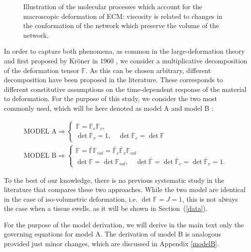 \documentclass[runningheads]{llncs}
\newcommand{\F}{\ensuremath{\mathbb{F}}}
\begin{document}
\begin{figure}[h!]
	\def\svgwidth{1.0\linewidth}
	
	\caption{Illustration of the molecular processes which account for the macroscopic deformation of ECM: viscosity is related to changes in the conformation of the network which preserve the volume of the network.}
	\label{deformation}
\end{figure}

In order to capture both phenomena, as common in the large-deformation theory \cite{Article1,CACCAVO2,Plasto,magneto,NGUYEN,growthtum} and first proposed by Kr\"{o}ner in 1960 \cite{kro}, we consider a multiplicative decomposition of the deformation tensor $\F$. As this can be chosen arbitrary, different decomposition have been proposed in the literature. These corresponds to different constitutive assumptions on the time-dependent response of the material to deformation. For the purpose of this study, we consider the two most commonly used, which will be here denoted as model A \cite{Article1,CACCAVO2,Plasto} and model B \cite{magneto,NGUYEN,Jeru}:

\begin{gather}
\text{MODEL A} \Rightarrow\begin{cases}
\F=\F_e\F_v,\\
\det\F_v=1, \quad \det\F_e=\det\F
\end{cases} \label{dec1}\tag{A}\\[4pt]
\text{MODEL B} \Rightarrow\begin{cases}
\F= \bar{\F}\F_{vol}=\bar{\F}_e\bar{\F}_v\F_{vol}\\
\det\F=\det\F_{vol},\quad \det\bar{\F}=\det\bar{\F}_e=\det\bar{\F}_v=1.\label{dec2}
\end{cases}\tag{B}
\end{gather}

To the best of our knowledge, there is no previous systematic study in the literature that compares these two approaches. While the two model are identical in the case of iso-volumetric deformation, i.e. $\det \F=J=1$, this is not always the case when a tissue swells, as it will be shown in Section~(\ref{data}).

For the purpose of the model derivation, we will derive in the main text only the governing equations for model A. The derivation of model B is analogous provided just minor changes, which are discussed in Appendix \ref{modelB}. 

%	
%	
\end{document}
